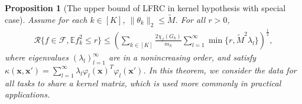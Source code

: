 \documentclass{article}
\def\vx{{\mathbf{x}}}
\def\eE{\mathbb{E}}
\newtheorem{proposition}{Proposition}
\begin{document}
\begin{proposition} [The upper bound of LFRC in kernel hypothesis with special case] \label{thm:kernel compute2}
Assume for each $k \in [K]$, $\|\theta_k\|_2 \leq \widetilde{M}$. For all $r > 0$,  
\begin{align}
    \mathcal{R}\{ f \in \mathcal{F}, \eE f_k^2 \leq r \} \leq \left(\sum _{k \in [K]} \frac{2 \chi_f(G_k)}{m_k} \sum_{l=1}^{\infty} \min \{r,\widetilde{M}^2 \lambda_l \} \right)^\frac{1}{2},
\end{align}
where eigenvalues $(\lambda _l) _{l=1} ^{\infty}$ are in a nonincreasing order, and satisfy $\kappa (\vx,\vx') = \sum _{l =1} ^{\infty} \lambda_l \varphi_l (\vx)^T \varphi _l (\vx') $. In this theorem, we consider the data for all tasks to share a kernel matrix, which is used more commonly in practical applications. 
    
\end{proposition}
\end{document}
